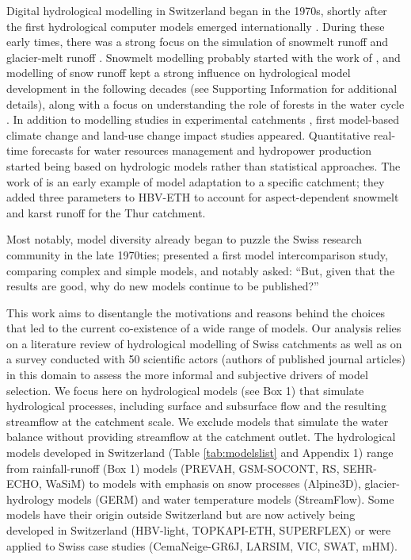 \documentclass[10pt,a4paper]{article}
\begin{document}
Digital hydrological modelling in Switzerland began in the 1970s, shortly after the first hydrological computer models emerged internationally \citep{Peel2020}. During these early times, there was a strong focus on the simulation of snowmelt runoff \citep{Martinec1970, Braun1986} and glacier-melt runoff \citep{Braun1990}. Snowmelt modelling probably started with the work of \citet{Hoeck1952}, and modelling of snow runoff kept a strong influence on hydrological model development in the following decades (see Supporting Information for additional details), along with a focus on understanding the role of forests in the water cycle \citep{Keller1991, Forster1989}. In addition to modelling studies in experimental catchments \citep{Iorgulescu1994}, first model-based climate change \citep{Bultot1992a} and land-use change \citep{Jordan1990a} impact studies appeared. Quantitative real-time forecasts for water resources management \citep{Lugiez1969} and hydropower production \citep{Jensenlang1973} started being based on hydrologic models rather than statistical approaches. The work of \citet{Hottelet1993} is an early example of model adaptation to a specific catchment; they added three parameters to HBV-ETH to account for aspect-dependent snowmelt and karst runoff for the Thur catchment.

Most notably, model diversity already began to puzzle the Swiss research community in the late 1970ties; \citet{Naef1977} presented a first model intercomparison study, comparing complex and simple models, and \citet{Naef1981} notably asked: ``But, given that the results are good, why do new models continue to be published?''

This work aims to disentangle the motivations and reasons behind the choices that led to the current co-existence of a wide range of models. Our analysis relies on a literature review of hydrological modelling of Swiss catchments as well as on a survey conducted with 50 scientific actors (authors of published journal articles) in this domain to assess the more informal and subjective drivers of model selection. We focus here on hydrological models (see Box 1) that simulate hydrological processes, including surface and subsurface flow and the resulting streamflow at the catchment scale. We exclude models that simulate the water balance without providing streamflow at the catchment outlet. The hydrological models developed in Switzerland (Table \ref{tab:modelslist} and Appendix 1) range from rainfall-runoff (Box 1) models (PREVAH, GSM-SOCONT, RS, SEHR-ECHO, WaSiM) to models with emphasis on snow processes (Alpine3D), glacier-hydrology models (GERM) and water temperature models (StreamFlow). Some models have their origin outside Switzerland but are now actively being developed in Switzerland (HBV-light, TOPKAPI-ETH, SUPERFLEX) or were applied to Swiss case studies (CemaNeige-GR6J, LARSIM, VIC, SWAT, mHM).
\end{document}
